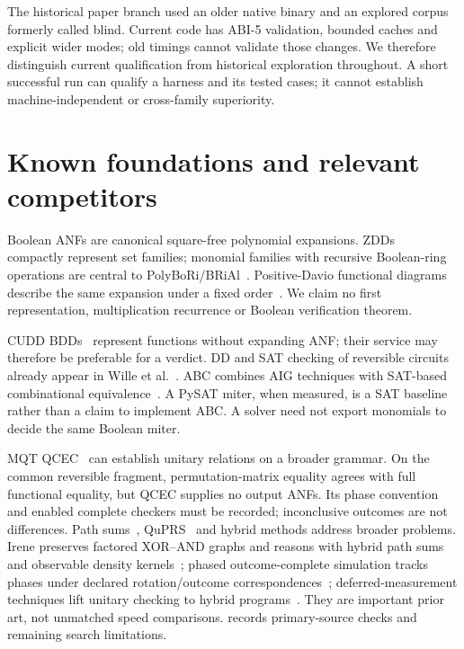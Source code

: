 \documentclass[10pt,a4paper]{article}
\begin{document}
The historical paper branch used an older native binary and an explored corpus formerly
called blind. Current code has ABI-5 validation, bounded caches and explicit wider modes;
old timings cannot validate those changes. We therefore distinguish current qualification
from historical exploration throughout. A short successful run can qualify a harness and
its tested cases; it cannot establish machine-independent or cross-family superiority.

\section{Known foundations and relevant competitors}
Boolean ANFs are canonical square-free polynomial expansions. ZDDs~\cite{minato1993zdd,
minato1995polynomials,minato2001zdd} compactly represent set families; monomial families with
recursive Boolean-ring operations are central to PolyBoRi/BRiAl~\cite{brickenstein2009polybori,
brickenstein2008groebner,brial}. Positive-Davio functional diagrams describe the same
expansion under a fixed order~\cite{kebschull1992fdd,drechsler1996ofdd}. We claim no first
representation, multiplication recurrence or Boolean verification theorem.

CUDD BDDs~\cite{bryant1986graph,somenzi2015cudd,dd060} represent functions without expanding
ANF; their service may therefore be preferable for a verdict. DD and SAT checking of
reversible circuits already appear in Wille et al.~\cite{wille2009equivalence}. ABC combines
AIG techniques with SAT-based combinational equivalence~\cite{brayton2010abc,
mishchenko2006cec}. A PySAT miter, when measured, is a SAT baseline rather than a claim to
implement ABC. A solver need not export monomials to decide the same Boolean miter.

MQT QCEC~\cite{burgholzer2021advanced,burgholzer2021qcec,qcecrepo} can establish unitary
relations on a broader grammar. On the common reversible fragment, permutation-matrix
equality agrees with full functional equality, but QCEC supplies no output ANFs. Its phase
convention and enabled complete checkers must be recorded; inconclusive outcomes are not
differences. Path sums~\cite{amy2019towards}, QuPRS~\cite{huang2026quprs} and hybrid
methods address broader problems. Irene preserves factored XOR--AND graphs and reasons
with hybrid path sums and observable density kernels~\cite{ke2026irene}; phased
outcome-complete simulation tracks phases under declared rotation/outcome
correspondences~\cite{kliuchnikov2026phased}; deferred-measurement techniques lift unitary
checking to hybrid programs~\cite{ricciardi2025hybrid}. They are important prior art, not
unmatched speed comparisons.  records primary-source checks and
remaining search limitations.
\end{document}

